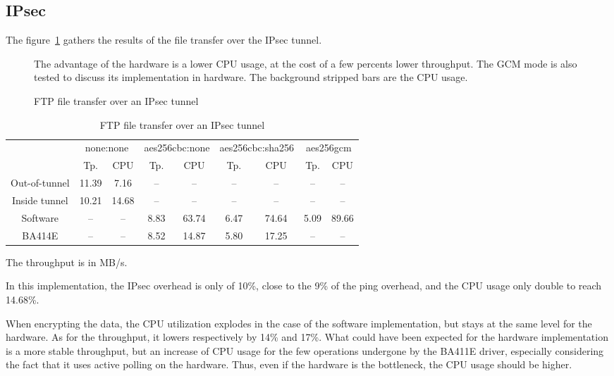 \subsection{IPsec}
The figure~\ref{fig:ipsec-ftp-bench} gathers the results of the file transfer over the IPsec tunnel.
\begin{figure}[ht]

\caption{FTP file transfer over an IPsec tunnel}{The advantage of the hardware is a lower CPU usage, at the cost of a few percents lower throughput. The GCM mode is also tested to discuss its implementation in hardware. The background stripped bars are the CPU usage.}
\label{fig:ipsec-ftp-bench}
\end{figure}

\begin{table}[ht]
\center
\small
\begin{tabular}{l|c|c|c|c|c|c|c|c|} \cline{2-9}
 & \multicolumn{2}{c|}{none:none} & \multicolumn{2}{c|}{aes256cbc:none} & \multicolumn{2}{c|}{aes256cbc:sha256} & \multicolumn{2}{c|}{aes256gcm} \\ \cline{2-9}
 & Tp.  & CPU & Tp.  & CPU & Tp.  & CPU & Tp.  & CPU \\ \hline
\multicolumn{1}{|c|}{Out-of-tunnel} & 11.39 & 7.16 & -- & -- & -- & -- & -- & -- \\ \hline
\multicolumn{1}{|c|}{Inside tunnel} & 10.21 & 14.68 & -- & -- & -- & -- & -- & -- \\ \hline
\multicolumn{1}{|c|}{Software} & -- & -- & 8.83 & 63.74 & 6.47 & 74.64 & 5.09 & 89.66 \\ \hline
\multicolumn{1}{|c|}{BA414E} & -- & -- & 8.52 & 14.87 & 5.80 & 17.25 & -- & -- \\ \hline
\end{tabular}
\caption{FTP file transfer over an IPsec tunnel}{The throughput is in MB/s.}
\label{tab:ipsec-ftp-bench}
\end{table}

In this implementation, the IPsec overhead is only of 10\%, close to the 9\% of the ping overhead, and the CPU usage only double to reach 14.68\%.

When encrypting the data, the CPU utilization explodes in the case of the software implementation, but stays at the same level for the hardware.
As for the throughput, it lowers respectively by 14\% and 17\%.
What could have been expected for the hardware implementation is a more stable throughput, but an increase of CPU usage for the few operations undergone by the BA411E driver, especially considering the fact that it uses active polling on the hardware.
Thus, even if the hardware is the bottleneck, the CPU usage should be higher.


